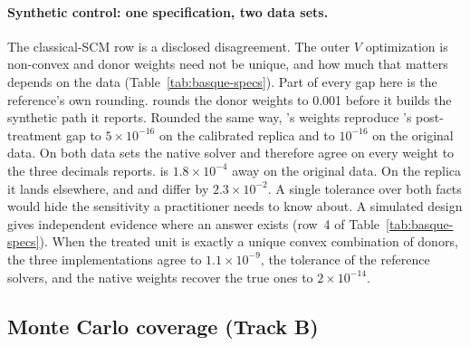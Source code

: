\begin{table}[!ht]
\centering\footnotesize

\caption{Seed-replicated comparison of  and
~2.6.1 on fixed data (AIPW ATE; ATT in the archive). Every
column except Seeds and Ratio is in units of 's mean reported
sampling standard error \(\mathrm{SE}_s\). ``Gap'' is the difference of
seed means; the TOST bound is \(|\mathrm{gap}| + c\,\mathrm{SE}_{MC}\)
with \(c\) the one-sided 5\% normal or Welch \(t\) critical value and
\(\mathrm{SE}_{MC}\) the gap's algorithmic Monte Carlo standard error;
``Seed SD'' is each engine's seed-to-seed standard deviation and
``Ratio'' their quotient. Equivalence against
\(\delta = 0.1\,\mathrm{SE}_s\) requires both bounds below 0.1 and holds
in every row.}
\label{tab:forest-seed-mc}
\end{table}

\paragraph{Synthetic control: one specification, two data sets.}\label{sec:scm-identification}
The classical-SCM row is a disclosed disagreement. The outer \(V\) optimization
is non-convex and donor weights need not be unique, and how much that
matters depends on the data (Table~\ref{tab:basque-specs}). Part of every
 gap here is the reference's own rounding. 
rounds the donor weights to 0.001 before it builds the synthetic path it
reports. Rounded the same way, \statspai{}'s weights reproduce
's post-treatment gap to \(5\times10^{-16}\) on the
calibrated replica and to \(10^{-16}\) on the original
 data. On both data sets the native solver and
 therefore agree on every weight to the three decimals
 reports.   is \(1.8\times10^{-4}\)
away on the original data. On the replica it lands elsewhere, and
  and   differ by
\(2.3\times10^{-2}\).
A single tolerance over both facts would hide the sensitivity a
practitioner needs to know about. A simulated design gives independent evidence
where an answer exists (row~4 of Table~\ref{tab:basque-specs}). When the treated unit is exactly a unique convex
combination of donors, the three implementations agree to
\(1.1\times10^{-9}\), the tolerance of the reference solvers, and the native
weights recover the true ones to \(2\times10^{-14}\).

\subsection{Monte Carlo coverage (Track B)}\label{sec:track-b}

